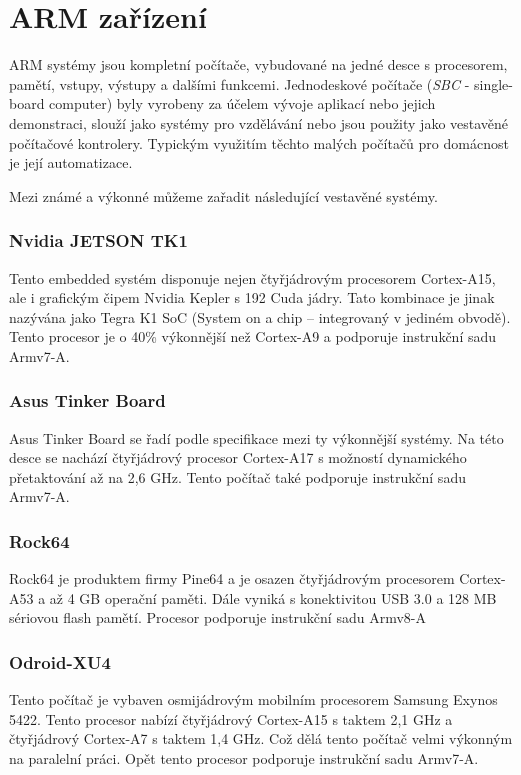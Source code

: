 \section{ARM zařízení}
ARM systémy jsou kompletní počítače, vybudované na jedné desce s procesorem, pamětí, vstupy, výstupy a dalšími funkcemi. Jednodeskové počítače (\textit{SBC} - single-board computer) byly vyrobeny za účelem vývoje aplikací nebo jejich demonstraci, slouží jako systémy pro vzdělávání nebo jsou použity jako vestavěné počítačové kontrolery. Typickým využitím těchto malých počítačů pro domácnost je její automatizace. 

Mezi známé a výkonné  můžeme zařadit následující vestavěné systémy.

\subsubsection*{Nvidia JETSON TK1}
Tento embedded systém disponuje nejen čtyřjádrovým procesorem Cortex-A15, ale i grafickým čipem Nvidia Kepler s 192 Cuda jádry. Tato kombinace je jinak nazývána jako Tegra K1 SoC (System on a chip – integrovaný v jediném obvodě). Tento procesor je o 40\% výkonnější než Cortex-A9 a podporuje instrukční sadu Armv7-A.

\subsubsection*{Asus Tinker Board}
Asus Tinker Board se řadí podle specifikace mezi ty výkonnější systémy. Na této desce se nachází čtyřjádrový procesor Cortex-A17 s možností dynamického přetaktování až na 2,6 GHz. Tento počítač také podporuje instrukční sadu Armv7-A.  

\subsubsection*{Rock64}
Rock64 je produktem firmy Pine64 a je osazen čtyřjádrovým procesorem Cortex-A53 a až 4 GB operační paměti. Dále vyniká s konektivitou USB 3.0 a 128 MB sériovou flash pamětí. Procesor podporuje instrukční sadu Armv8-A

\subsubsection*{Odroid-XU4}
Tento počítač je vybaven osmijádrovým mobilním procesorem Samsung Exynos 5422. Tento procesor nabízí čtyřjádrový Cortex-A15 s taktem 2,1 GHz a čtyřjádrový Cortex-A7 s taktem 1,4 GHz. Což dělá tento počítač velmi výkonným na paralelní práci. Opět tento procesor podporuje instrukční sadu Armv7-A.

